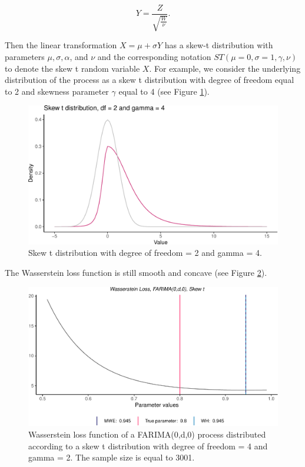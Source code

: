 \documentclass[
  11pt,
]{article}
\begin{document}
\[Y=\frac{Z}{\sqrt{\frac{W}{\nu}}}.\]

Then the linear transformation \(X=\mu+\sigma Y\) has a skew-t
distribution with parameters \(\mu, \sigma, \alpha\), and \(\nu\) and
the corresponding notation \(S T(\mu = 0, \sigma = 1, \gamma, \nu)\) to
denote the skew t random variable \(X\). For example, we consider the
underlying distribution of the process as a skew t distribution with
degree of freedom equal to 2 and skewness parameter \(\gamma\) equal to
4 (see Figure \ref{fig:skewt_density}).

\begin{figure}

{\centering \includegraphics[width=0.5\linewidth]{Master_thesis_V1_files/figure-latex/skewt_density-1} 

}

\caption{Skew t distribution with degree of freedom = 2 and gamma = 4.}\label{fig:skewt_density}
\end{figure}

The Wasserstein loss function is still smooth and concave (see Figure
\ref{fig:skew_t}).

\begin{figure}

{\centering \includegraphics[width=0.6\linewidth]{Master_thesis_V1_files/figure-latex/skew_t-1} 

}

\caption{Wasserstein loss function of a FARIMA(0,d,0) process distributed according to a skew t distribution with degree of freedom = 4 and gamma = 2. The sample size is equal to 3001.}\label{fig:skew_t}
\end{figure}
\end{document}
